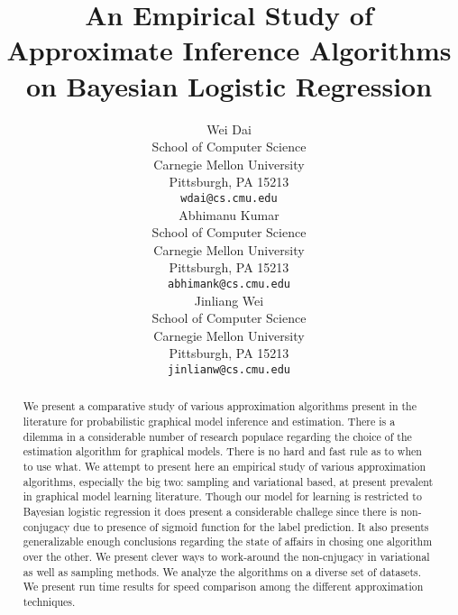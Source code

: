 \documentclass{article}
\title{An Empirical Study of Approximate Inference Algorithms on Bayesian
Logistic Regression}
\author{
Wei Dai \\
School of Computer Science \\
Carnegie Mellon University\\
Pittsburgh, PA 15213\\
\texttt{wdai@cs.cmu.edu}\\
\And
Abhimanu Kumar \\
School of Computer Science \\
Carnegie Mellon University\\
Pittsburgh, PA 15213\\
\texttt{abhimank@cs.cmu.edu}\\
\And
Jinliang Wei \\
School of Computer Science \\
Carnegie Mellon University\\
Pittsburgh, PA 15213\\
\texttt{jinlianw@cs.cmu.edu}\\
}
\begin{document}
\maketitle

\begin{abstract}

We present a comparative study of various approximation algorithms present in
the literature for probabilistic graphical model inference and estimation. There
is a dilemma in a considerable number of research populace regarding the choice
of the estimation algorithm for graphical models. There is no hard and
fast rule as to when to use what. We attempt to present here an empirical study of
various approximation algorithms, especially the big two: sampling
and variational based, at present prevalent in graphical model learning
literature.
Though our model for learning is restricted to Bayesian logistic regression it does present a
considerable challege since there is non-conjugacy due to presence of sigmoid
function for the label prediction. It also presents generalizable enough
conclusions regarding the state of affairs in chosing one algorithm over
the other. We present clever ways to work-around the non-cnjugacy in variational as
well as sampling methods. We analyze the algorithms on a diverse set 
of datasets. We present run time results for speed comparison among the
different approximation techniques. 

\end{abstract}

\setcounter{page}{1}











\end{document}
